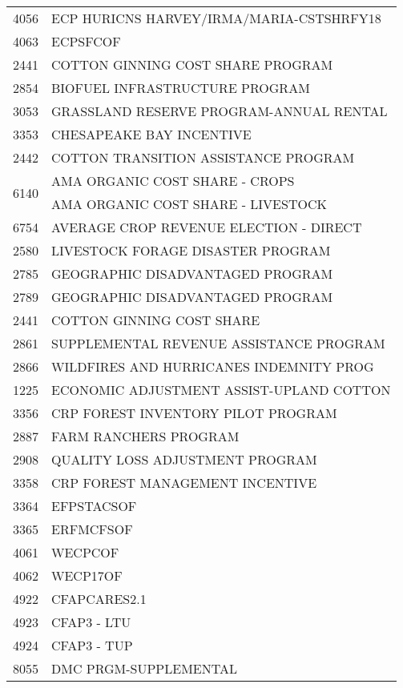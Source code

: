 \begin{longtable}{ll}
\cline{1-2}
4056 & ECP HURICNS HARVEY/IRMA/MARIA-CSTSHRFY18 \\
\cline{1-2}
4063 & ECPSFCOF \\
\cline{1-2}
2441 & COTTON GINNING COST SHARE PROGRAM \\
\cline{1-2}
2854 & BIOFUEL INFRASTRUCTURE PROGRAM \\
\cline{1-2}
3053 & GRASSLAND RESERVE PROGRAM-ANNUAL RENTAL \\
\cline{1-2}
3353 & CHESAPEAKE BAY INCENTIVE \\
\cline{1-2}
2442 & COTTON TRANSITION ASSISTANCE PROGRAM \\
\cline{1-2}
\multirow[t]{2}{*}{6140} & AMA ORGANIC COST SHARE - CROPS \\
 & AMA ORGANIC COST SHARE - LIVESTOCK \\
\cline{1-2}
6754 & AVERAGE CROP REVENUE ELECTION - DIRECT \\
\cline{1-2}
2580 & LIVESTOCK FORAGE DISASTER PROGRAM \\
\cline{1-2}
2785 & GEOGRAPHIC DISADVANTAGED PROGRAM \\
\cline{1-2}
2789 & GEOGRAPHIC DISADVANTAGED PROGRAM \\
\cline{1-2}
2441 & COTTON GINNING COST SHARE \\
\cline{1-2}
2861 & SUPPLEMENTAL REVENUE ASSISTANCE PROGRAM \\
\cline{1-2}
2866 & WILDFIRES AND HURRICANES INDEMNITY PROG \\
\cline{1-2}
1225 & ECONOMIC ADJUSTMENT ASSIST-UPLAND COTTON \\
\cline{1-2}
3356 & CRP FOREST INVENTORY PILOT PROGRAM \\
\cline{1-2}
2887 & FARM RANCHERS PROGRAM \\
\cline{1-2}
2908 & QUALITY LOSS ADJUSTMENT PROGRAM \\
\cline{1-2}
3358 & CRP FOREST MANAGEMENT INCENTIVE \\
\cline{1-2}
3364 & EFPSTACSOF \\
\cline{1-2}
3365 & ERFMCFSOF \\
\cline{1-2}
4061 & WECPCOF \\
\cline{1-2}
4062 & WECP17OF \\
\cline{1-2}
4922 & CFAPCARES2.1 \\
\cline{1-2}
4923 & CFAP3 - LTU \\
\cline{1-2}
4924 & CFAP3 - TUP \\
\cline{1-2}
8055 & DMC PRGM-SUPPLEMENTAL \\
\cline{1-2}

\end{longtable}
